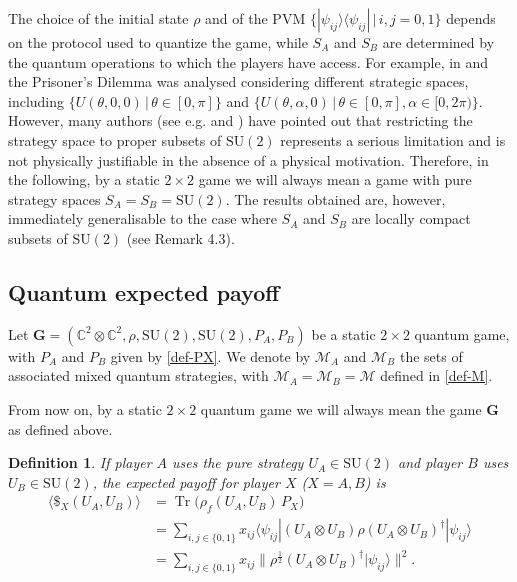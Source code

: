 \documentclass[11pt,a4paper,twoside]{article}
\DeclareMathOperator{\Tr}{Tr}
\newcommand{\SU}{\mathrm{SU}}
\newtheorem{definition}{Definition}
\begin{document}
The choice of the initial state $\rho$ and of the PVM $\{|\psi_{ij}\rangle\langle\psi_{ij}|\,|\,i,j=0,1\}$ depends on the protocol used to quantize the game, while $S_A$ and $S_B$ are determined by the quantum operations to which the players have access. For example, in \cite{eisert_2009} and \cite{eisert_quantum} the Prisoner's Dilemma was analysed considering different strategic spaces, including $\{U(\theta,0,0)\,|\,\theta\in[0,\pi]\}$ and $\{U(\theta,\alpha,0)\,|\,\theta\in[0,\pi], \alpha\in[0,2\pi)\}$. However, many authors (see e.g. \cite{benjamin} and \cite{flitney_hollenberg}) have pointed out that restricting the strategy space to proper subsets of $\SU(2)$ represents a serious limitation and is not physically justifiable in the absence of a physical motivation. Therefore, in the following, by a static $2\times2$ game we will always mean a game with pure strategy spaces $S_A=S_B=\SU(2)$. The results obtained are, however, immediately generalisable to the case where $S_A$ and $S_B$ are locally compact subsets of $\SU(2)$ (see Remark 4.3).




\subsection{Quantum expected payoff}
Let $\mathbf{G}= (\mathbb{C}^2\otimes\mathbb{C}^2, \rho, \SU(2), \SU(2), P_A, P_B)$ be a
static $2\times 2$ quantum game, with $P_A$ and $P_B$ given by \eqref{def-PX}. We denote by $\mathcal{M}_A$ and $\mathcal{M}_B$ the sets of associated mixed quantum strategies, with $\mathcal{M}_A=\mathcal{M}_B=\mathcal{M}$ defined in \eqref{def-M}.

From now on, by a static $2\times 2$ quantum game we will always mean the game $\mathbf{G}$ as defined above.
\begin{definition}
If player \(A\) uses the pure strategy \(U_A\in\SU(2)\) and player \(B\) uses \(U_B\in\SU(2)\), the \emph{expected payoff} for player \(X\) (\(X=A,B\)) is
\begin{align*}
\langle\$_X(U_A,U_B)\rangle &= \Tr\bigl(\rho_f(U_A,U_B)\,P_X\bigr)\\
&=\sum_{i,j\in\{0,1\}} x_{ij}\langle\psi_{ij}|(U_A\otimes U_B)\rho(U_A\otimes U_B)^\dagger|\psi_{ij}\rangle\\
&=\sum_{i,j\in\{0,1\}} x_{ij}\|\rho^\frac{1}{2}(U_A\otimes U_B)^\dagger|\psi_{ij}\rangle\|^2.
\end{align*}
\end{definition}
\end{document}
